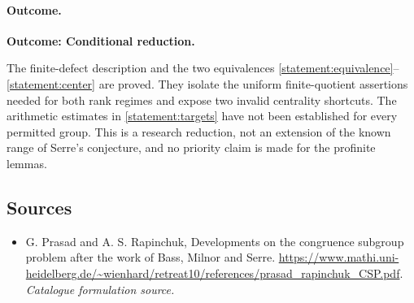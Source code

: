 \documentclass[11pt,a4paper]{article}
\numberwithin{equation}{section}
\begin{document}
\paragraph{Outcome.}
\textbf{Outcome: Conditional reduction.}

The finite-defect description and the two equivalences
\eqref{statement:equivalence}--\eqref{statement:center} are proved.  They isolate the
uniform finite-quotient assertions needed for both rank regimes and expose
two invalid centrality shortcuts.  The arithmetic estimates in
\eqref{statement:targets} have not been established for every permitted group.
This is a research reduction, not an extension of the known range of
Serre's conjecture, and no priority claim is made for the profinite lemmas.
\subsection{Sources}
\begin{itemize}\raggedright
\item[\textnormal{[S1]}]\hypertarget{source:statement:1}{} G. Prasad and A. S. Rapinchuk, Developments on the congruence subgroup problem after the work of Bass, Milnor and Serre.
\url{https://www.mathi.uni-heidelberg.de/~wienhard/retreat10/references/prasad_rapinchuk_CSP.pdf}.
{\small\textit{Catalogue formulation source.}}
\end{itemize}
\end{document}

